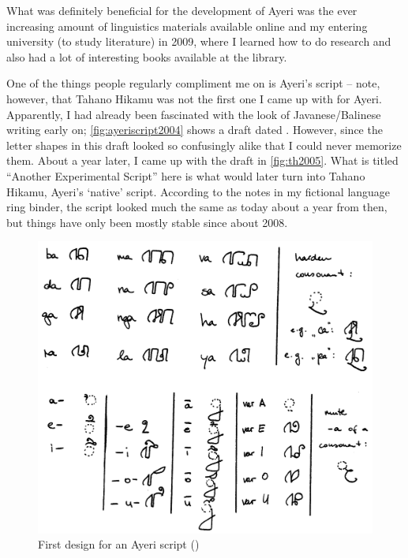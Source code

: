 What was definitely beneficial for the development of Ayeri was the ever 
increasing amount of linguistics materials available online and my entering 
university (to study literature) in 2009, where I learned how to do research 
and also had a lot of interesting books available at the library.

One of the things people regularly compliment me on is Ayeri's script -- note, 
however, that Tahano Hikamu was not the first one I came up with for Ayeri. 
Apparently, I had already been fascinated with the look of Javanese/Balinese 
writing early on; \autoref{fig:ayeriscript2004} shows a draft dated 
. However, since the letter shapes in this draft looked so 
confusingly alike that I could never memorize them. About a year later, I came 
up with the draft in \autoref{fig:th2005}. What is titled ``Another 
Experimental Script'' here is what would later turn into Tahano Hikamu, Ayeri's 
`native' script. According to the notes in my fictional language ring binder, 
the script looked much the same as today about a year from then, but things 
have only been mostly stable since about 2008.

\begin{figure}
	\centering
	\includegraphics[width=\textwidth, keepaspectratio]{images/ayeriscript2004-300dpi-bw.png}
	\caption[First design for an Ayeri script]{First design for an Ayeri script ()}
	\label{fig:ayeriscript2004}
\end{figure}

